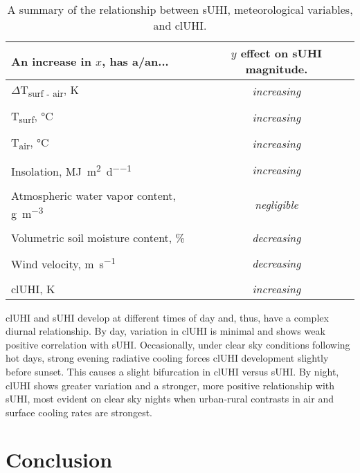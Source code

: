 \begin{bibunit}
\begin{table}[H]
	\centering
	\caption{A summary of the relationship between sUHI, meteorological variables, and clUHI.}
	\label{meteo_cont}
	\begin{tabular}{lc}
		\toprule 
		An increase in $x$, has a/an... & $y$ effect on sUHI magnitude. \\
		\midrule
		$\Delta$T\textsubscript{surf - air}, \si{\kelvin} &\textit{increasing} \\
		&\\
		T\textsubscript{surf}, \si{\degreeCelsius}  & \textit{increasing} \\
		&\\
		T\textsubscript{air}, \si{\degreeCelsius} & \textit{increasing} \\
		&\\
		Insolation, \si{\mega\joule\per\meter\squared\per\day} & \textit{increasing}  \\
		& \\
		Atmospheric water vapor content, \si{\gram\per\meter\cubed} & \textit{negligible} \\
		&\\
		Volumetric soil moisture content, \si{\percent} & \textit{decreasing} \\
		&\\
		Wind velocity, \si{\meter\per\second} &\textit{decreasing} \\
		&\\
		clUHI, \si{\kelvin} &\textit{increasing} \\
		\bottomrule
	\end{tabular} 
\end{table}

clUHI and sUHI develop at different times of day and, thus, have a complex diurnal relationship. By day, variation in clUHI is minimal and shows weak positive correlation with sUHI. Occasionally, under clear sky conditions following hot days, strong evening radiative cooling forces clUHI development slightly before sunset. This causes a slight bifurcation in clUHI versus sUHI. By night, clUHI shows greater variation and a stronger, more positive relationship with sUHI, most evident on clear sky nights when urban-rural contrasts in air and surface cooling rates are strongest. 

\section{Conclusion}


\end{bibunit}
